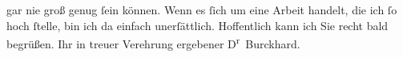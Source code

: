                gar nie groß genug{ }ſein können. Wenn es{ }ſich um eine Arbeit handelt, die ich{ }ſo hoch{ }ſtelle, bin ich da einfach unerſättlich. Hoffentlich kann ich Sie recht bald
               begrüßen.\pend
           \pstart Ihr in treuer Verehrung ergebener \spacefill\mbox{D\textsuperscript{r}
                  Burckhard.}\pend{}\endnumbering{}  \newcommand{\dateiname}{L01987}\newcommand{\titel}{Max Burckhard an Arthur Schnitzler, 25. 11. 1910}\newcommand{\editorInnen}{Martin Anton Müller und Gerd-Hermann Susen}
